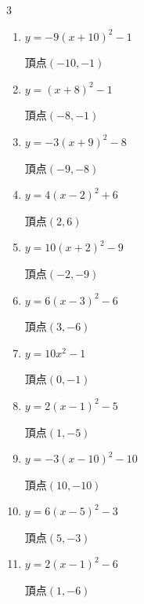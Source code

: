 \begin{multicols}{3}
\begin{enumerate}
        $\displaystyle 頂点\left( 0 , -1 \right)$

  \item $\displaystyle y=-9\left( x+10\right)^{2}-1$

        $\displaystyle 頂点\left( -10 , -1 \right)$

  \item $\displaystyle y=\left( x+8\right)^{2}-1$

        $\displaystyle 頂点\left( -8 , -1 \right)$

  \item $\displaystyle y=-3\left( x+9\right)^{2}-8$

        $\displaystyle 頂点\left( -9 , -8 \right)$

  \item $\displaystyle y=4\left( x-2\right)^{2}+6$

        $\displaystyle 頂点\left( 2 , 6 \right)$

  \item $\displaystyle y=10\left( x+2\right)^{2}-9$

        $\displaystyle 頂点\left( -2 , -9 \right)$

  \item $\displaystyle y=6\left( x-3\right)^{2}-6$

        $\displaystyle 頂点\left( 3 , -6 \right)$

  \item $\displaystyle y=10x^{2}-1$

        $\displaystyle 頂点\left( 0 , -1 \right)$

  \item $\displaystyle y=2\left( x-1\right)^{2}-5$

        $\displaystyle 頂点\left( 1 , -5 \right)$

\columnbreak %

  \item $\displaystyle y=-3\left( x-10\right)^{2}-10$

        $\displaystyle 頂点\left( 10 , -10 \right)$

  \item $\displaystyle y=6\left( x-5\right)^{2}-3$

        $\displaystyle 頂点\left( 5 , -3 \right)$

  \item $\displaystyle y=2\left( x-1\right)^{2}-6$

        $\displaystyle 頂点\left( 1 , -6 \right)$


\end{enumerate}
\end{multicols}
